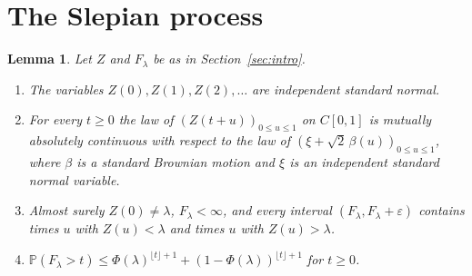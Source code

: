 \documentclass[11pt]{amsart}
\newtheorem{lemma}[theorem]{Lemma}
\theoremstyle{remark}
\numberwithin{equation}{section}
\newcommand{\PP}{\mathbb{P}}
\begin{document}
\section{The Slepian process}\label{sec:slepian}

\begin{lemma}\label{lem:slepian}
Let $Z$ and $F_\lambda$ be as in Section~\ref{sec:intro}.
\begin{enumerate}
\item The variables $Z(0),Z(1),Z(2),\dots$ are independent standard normal.
\item For every $t\ge0$ the law of $(Z(t+u))_{0\le u\le1}$ on $C[0,1]$ is mutually absolutely continuous with respect to the law of $(\xi+\sqrt2\,\beta(u))_{0\le u\le1}$, where $\beta$ is a standard Brownian motion and $\xi$ is an independent standard normal variable.
\item Almost surely $Z(0)\ne\lambda$, $F_\lambda<\infty$, and every interval $(F_\lambda,F_\lambda+\varepsilon)$ contains times $u$ with $Z(u)<\lambda$ and times $u$ with $Z(u)>\lambda$.
\item $\PP(F_\lambda>t)\le\Phi(\lambda)^{\lfloor t\rfloor+1}+(1-\Phi(\lambda))^{\lfloor t\rfloor+1}$ for $t\ge0$.
\end{enumerate}
\end{lemma}
\end{document}
